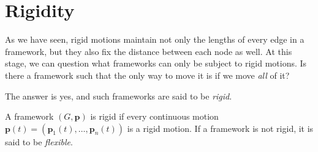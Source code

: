 \section{Rigidity}
\begin{flushleft}
As we have seen, rigid motions maintain not only the lengths of every edge in a framework, but they also fix the distance between each node as well. At this stage, we can question what frameworks can only be subject to rigid motions. Is there a framework such that the only way to move it is if we move \textit{all} of it?

The answer is yes, and such frameworks are said to be \textit{rigid}.
\end{flushleft}

\begin{definition}
\label{def: rigid}
A framework $(G,\mathbf{p})$ is rigid if every continuous motion $\mathbf{p}(t) = (\mathbf{p}_1(t), \hdots, \mathbf{p}_n(t))$ is a rigid motion. 
If a framework is not rigid, it is said to be \textit{flexible}.
\end{definition}

